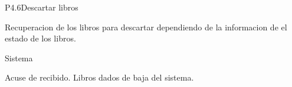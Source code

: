 \begin{Proceso}{P4.6}{Descartar libros }
   { %
  	\begin{UClist}
  		\UCli Recuperacion de los libros para descartar dependiendo de la informacion de el estado de los libros.
     	
    \end {UClist}
  }
  
   { %
    Sistema
  }

   { %
    \begin{UClist}
    
      \UCli Acuse de recibido.
      \UCli Libros dados de baja del sistema.
  
    \end{UClist}
  }

   { %
  }

   { %
  
  }
   { %
  }


\end{Proceso}

